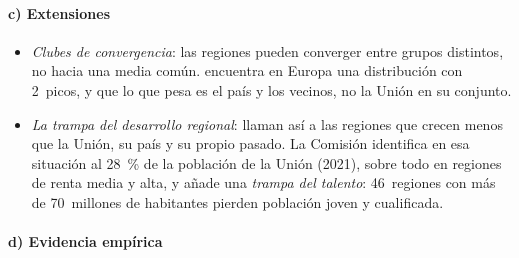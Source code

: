 \documentclass[11pt]{article}
\begin{document}
\paragraph{c) Extensiones}

\begin{itemize}
\item \emph{Clubes de convergencia}: las regiones pueden converger entre grupos distintos, no hacia una media común. \textcite{Quah1996} encuentra en Europa una distribución con 2~picos, y que lo que pesa es el país y los vecinos, no la Unión en su conjunto.
\item \emph{La trampa del desarrollo regional}: \textcite{DiemerEtAl2022} llaman así a las regiones que crecen menos que la Unión, su país y su propio pasado. La Comisión identifica en esa situación al 28~\% de la población de la Unión (2021), sobre todo en regiones de renta media y alta, y añade una \emph{trampa del talento}: 46~regiones con más de 70~millones de habitantes pierden población joven y cualificada\nocite{CE2024Informe9}.
\end{itemize}

\paragraph{d) Evidencia empírica}
\end{document}
